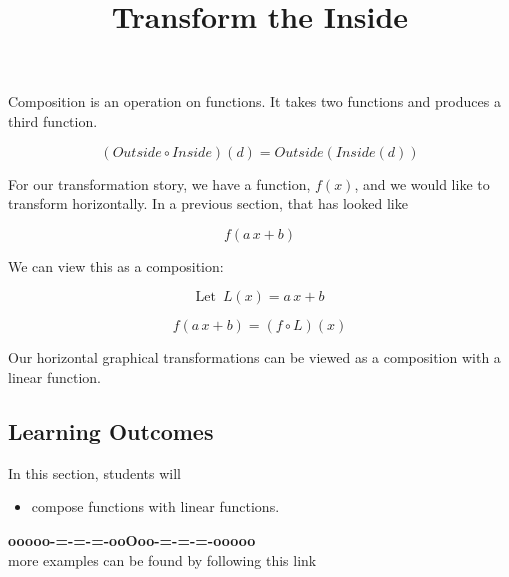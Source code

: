 \documentclass{ximera}
\title{Transform the Inside}
\begin{document}
\begin{abstract}
\end{abstract}
\maketitle






Composition is an operation on functions.  It takes two functions and produces a third function.


\[  (Outside \circ Inside)(d) = Outside(Inside(d))    \]


For our transformation story, we have a function, $f(x)$, and we would like to transform horizontally.  In a previous section, that has looked like


\[   f(a \, x + b)  \]


We can view this as a composition:


\[  \text{Let } \, L(x) = a \, x + b   \]


\[   f(a \, x + b)  = (f \circ L)(x)\]



Our horizontal graphical transformations can be viewed as a composition with a linear function.





\subsection*{Learning Outcomes}


\begin{sectionOutcomes}
In this section, students will 

\begin{itemize}
\item compose functions with linear functions.
\end{itemize}
\end{sectionOutcomes}











\begin{center}
\textbf{\textcolor{green!50!black}{ooooo-=-=-=-ooOoo-=-=-=-ooooo}} \\

more examples can be found by following this link\\ 

\end{center}
\end{document}
